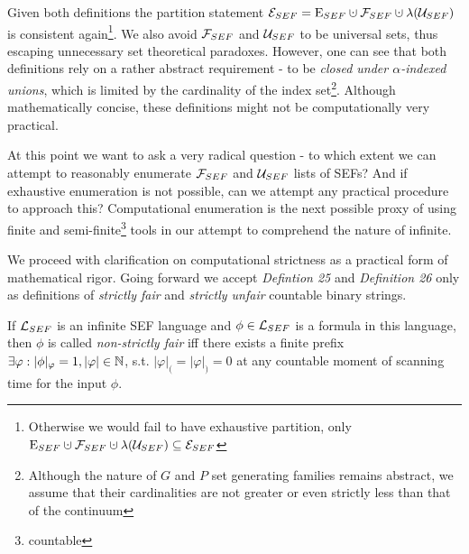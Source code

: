 Given both definitions the partition statement $\uesef = \cesef \cupdot \ufsef \cupdot \lambda(\uusef)$ is consistent again\footnote{Otherwise we would fail to have exhaustive partition, only $\cesef \cupdot \ufsef \cupdot \lambda(\uusef) \subseteq \uesef$ }. We also avoid $\mathcal{F}_{SEF}$ and $\mathcal{U}_{SEF}$ to be universal sets, thus escaping unnecessary set theoretical paradoxes. However, one can see that both definitions rely on a rather abstract requirement - to be \textit{closed under $\alpha$-indexed unions}, which is limited by the cardinality of the index set\footnote{Although the nature of $G$ and $P$ set generating families remains abstract, we assume that their cardinalities are not greater or even strictly less than that of the continuum}. Although mathematically concise, these definitions might not be computationally very practical.

At this point we want to ask a very radical question -  to which extent we can attempt to reasonably enumerate $\mathcal{F}_{SEF}$ and $\mathcal{U}_{SEF}$ lists of SEFs? And if exhaustive enumeration is not possible, can we attempt any practical procedure to approach this? Computational enumeration is the next possible proxy of using finite and semi-finite\footnote{countable} tools in our attempt to comprehend the nature of infinite.

We proceed with clarification on computational strictness as a practical form of mathematical rigor. Going forward we accept \textit{Defintion 25} and \textit{Definition 26} only as definitions of \textit{strictly fair} and \textit{strictly unfair} countable binary strings.

\begin{definition}
  If $\mathcal{L}_{SEF}$ is an infinite SEF language and $\phi \in \mathcal{L}_{SEF}$ is a formula in this language, then $\phi$ is called \textit{non-strictly fair} iff there exists a finite prefix $\exists \varphi: |\phi|_\varphi = 1, |\varphi| \in \mathbb{N}$, s.t. $|\varphi|_{(} = |\varphi|_{)} = 0$ at any countable moment of scanning time for the input $\phi$.
\end{definition}

